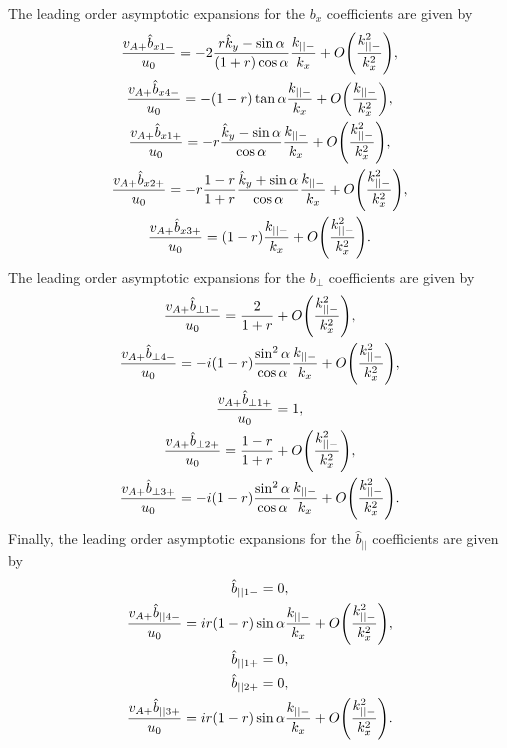 The leading order asymptotic expansions for the $b_x$ coefficients are given by
\begin{gather}
    \frac{v_{A+}\hat{b}_{x 1-}}{u_0} = -2\frac{r\hat{k}_y-\sin\alpha}{(1+r)\cos\alpha}\frac{k_{||-}}{k_x} + O\qty(\frac{k_{||-}^2}{k_x^2}), \\
    \frac{v_{A+}\hat{b}_{x 4-}}{u_0} = -(1-r)\tan\alpha\frac{k_{||-}}{k_x} + O\qty(\frac{k_{||-}}{k_x^2}), \\
    \frac{v_{A+}\hat{b}_{x 1+}}{u_0} = -r\frac{\hat{k}_y-\sin\alpha}{\cos\alpha}\frac{k_{||-}}{k_x} + O\qty(\frac{k_{||-}^2}{k_x^2}), \\
    \frac{v_{A+}\hat{b}_{x 2+}}{u_0} = -r\frac{1-r}{1+r}\frac{\hat{k}_y+\sin\alpha}{\cos\alpha}\frac{k_{||-}}{k_x} + O\qty(\frac{k_{||-}^2}{k_x^2}), \\
    \frac{v_{A+}\hat{b}_{x 3+}}{u_0} = (1-r)\frac{k_{||-}}{k_x} + O\qty(\frac{k_{||-}^2}{k_x^2}).
\end{gather}
The leading order asymptotic expansions for the $b_\perp$ coefficients are given by
\begin{gather}
    \frac{v_{A+}\hat{b}_{\perp 1-}}{u_0} = \frac{2}{1+r} + O\qty(\frac{k_{||-}^2}{k_x^2}), \\
    \frac{v_{A+}\hat{b}_{\perp 4-}}{u_0} = -i(1-r)\frac{\sin^2\alpha}{\cos\alpha}\frac{k_{||-}}{k_x} + O\qty(\frac{k_{||-}^2}{k_x^2}), \\
    \frac{v_{A+}\hat{b}_{\perp 1+}}{u_0} = 1, \\
    \frac{v_{A+}\hat{b}_{\perp 2+}}{u_0} = \frac{1-r}{1+r} + O\qty(\frac{k_{||-}^2}{k_x^2}), \\
    \frac{v_{A+}\hat{b}_{\perp 3+}}{u_0} = -i(1-r)\frac{\sin^2\alpha}{\cos\alpha}\frac{k_{||-}}{k_x} + O\qty(\frac{k_{||-}^2}{k_x^2}).
\end{gather}
Finally, the leading order asymptotic expansions for the $\hat{b}_{||}$ coefficients are given by
\begin{gather}
    \hat{b}_{|| 1-} = 0, \\
    \frac{v_{A+}\hat{b}_{|| 4-}}{u_0} = ir(1-r)\sin\alpha\frac{k_{||-}}{k_x} + O\qty(\frac{k_{||-}^2}{k_x^2}), \\
    \hat{b}_{|| 1+} = 0, \\
    \hat{b}_{|| 2+} = 0, \\
    \label{eq:oblique_field_uniform_in_x_b_par30+}
    \frac{v_{A+}\hat{b}_{|| 3+}}{u_0} = ir(1-r)\sin\alpha\frac{k_{||-}}{k_x} + O\qty(\frac{k_{||-}^2}{k_x^2}).
\end{gather}

